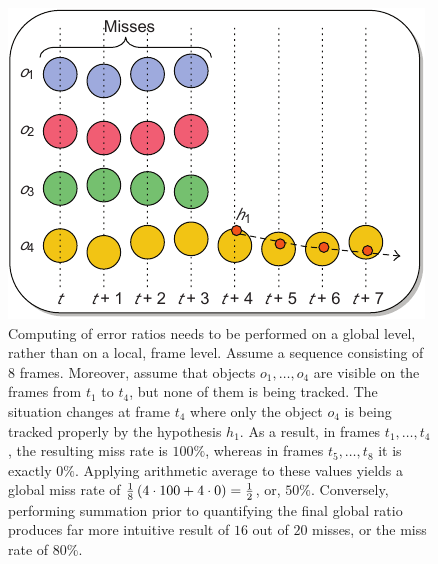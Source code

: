\begin{figure}[t]
    \centerline{\includegraphics[width=0.6\linewidth]{figures/theoretical_foundations/local_vs_global_ratio_evaluation.pdf}}
    \caption[Local vs. global ratio evaluation]{Computing of error ratios needs to be performed on a global level, rather than on a local, frame level. Assume a sequence consisting of $8$ frames. Moreover, assume that objects $o_1, \dots, o_4$ are visible on the frames from $t_1$ to $t_4$, but none of them is being tracked. The situation changes at frame $t_4$ where only the object $o_4$ is being tracked properly by the hypothesis $h_1$. As a result, in frames $t_1, \dots, t_4$, the resulting miss rate is $100\%$, whereas in frames $t_5, \dots, t_8$ it is exactly $0\%$. Applying arithmetic average to these values yields a global miss rate of $\frac{1}{8} \left( {4 \cdot 100 + 4 \cdot 0} \right) = \frac{1}{2}$, or, $50\%$. Conversely, performing summation prior to quantifying the final global ratio produces far more intuitive result of $16$ out of $20$ misses, or the miss rate of $80\%$. }
    \label{fig:LocalGlobalRatioEval}
\end{figure}
